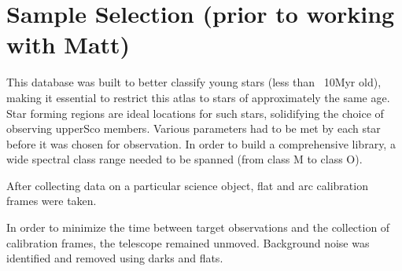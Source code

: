 \section{Sample Selection (prior to working with Matt)}

This database was built to better classify young stars (less than ~10Myr old), making it essential to restrict this atlas to stars of approximately the same age.  
Star forming regions are ideal locations for such stars, solidifying the choice of observing upperSco members.  Various parameters had to be met by each star before it was chosen for observation.  In order to build a comprehensive library, a wide spectral class range needed to be spanned (from class M to class O).  



After collecting data on a particular science object, flat and arc calibration frames were taken.  

In order to minimize the time between target observations and the collection of calibration frames, the telescope remained unmoved.  Background noise was identified and removed using darks and flats.